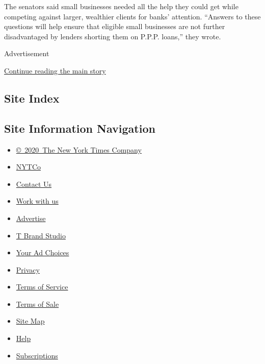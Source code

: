 The senators said small businesses needed all the help they could get
while competing against larger, wealthier clients for banks' attention.
``Answers to these questions will help ensure that eligible small
businesses are not further disadvantaged by lenders shorting them on
P.P.P. loans,'' they wrote.

Advertisement

\protect\hyperlink{after-bottom}{Continue reading the main story}

\hypertarget{site-index}{%
\subsection{Site Index}\label{site-index}}

\hypertarget{site-information-navigation}{%
\subsection{Site Information
Navigation}\label{site-information-navigation}}

\begin{itemize}
\tightlist
\item
  \href{https://help.nytimes.com/hc/en-us/articles/115014792127-Copyright-notice}{©~2020~The
  New York Times Company}
\end{itemize}

\begin{itemize}
\tightlist
\item
  \href{https://www.nytco.com/}{NYTCo}
\item
  \href{https://help.nytimes.com/hc/en-us/articles/115015385887-Contact-Us}{Contact
  Us}
\item
  \href{https://www.nytco.com/careers/}{Work with us}
\item
  \href{https://nytmediakit.com/}{Advertise}
\item
  \href{http://www.tbrandstudio.com/}{T Brand Studio}
\item
  \href{https://www.nytimes.com/privacy/cookie-policy\#how-do-i-manage-trackers}{Your
  Ad Choices}
\item
  \href{https://www.nytimes.com/privacy}{Privacy}
\item
  \href{https://help.nytimes.com/hc/en-us/articles/115014893428-Terms-of-service}{Terms
  of Service}
\item
  \href{https://help.nytimes.com/hc/en-us/articles/115014893968-Terms-of-sale}{Terms
  of Sale}
\item
  \href{https://spiderbites.nytimes.com}{Site Map}
\item
  \href{https://help.nytimes.com/hc/en-us}{Help}
\item
  \href{https://www.nytimes.com/subscription?campaignId=37WXW}{Subscriptions}
\end{itemize}
